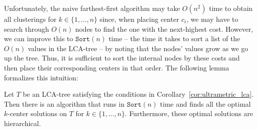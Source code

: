 Unfortunately, the naive farthest-first algorithm may take $O(n^2)$ time to obtain all clusterings for $k \in \{1, \ldots, n\}$ since, when placing center
$c_i$, we may have to search through $O(n)$ nodes to find the one with the next-highest cost. However, we can improve this to $\texttt{Sort}(n)$ time -- the
time it takes to sort a list of the $O(n)$ values in the LCA-tree -- by noting that the nodes' values grow as we go up the tree. Thus, it is sufficient to sort
the internal nodes by these costs and then place their corresponding centers in that order. The following lemma formalizes this intuition:

\begin{lemma}
    \label{lma:optimal_kcenter}
    Let $T$ be an LCA-tree satisfying the conditions in Corollary~\ref{cor:ultrametric_lca}. Then there is an algorithm that runs in $\texttt{Sort}(n)$ time and
    finds all the optimal $k$-center solutions on $T$ for $k \in \{1, \ldots, n\}$. Furthermore, these optimal solutions are hierarchical.
\end{lemma}


